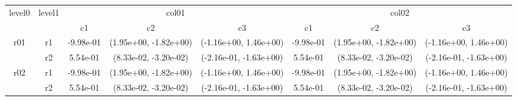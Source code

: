 \begin{tabular}{cccccccc}
\toprule
\multirow{2}{*}{level0} & \multirow{2}{*}{level1}&\multicolumn{3}{c}{col01}&\multicolumn{3}{c}{col02}\tabularnewline
\cmidrule(lr){3-5}
\cmidrule(lr){6-8}
&&c1&c2&c3&c1&c2&c3\tabularnewline
\midrule
\midrule
\multirow{2}{*}{r01}&r1&-9.98e-01& (1.95e+00, -1.82e+00)& (-1.16e+00, 1.46e+00)&-9.98e-01& (1.95e+00, -1.82e+00)& (-1.16e+00, 1.46e+00)\tabularnewline
&r2&5.54e-01& (8.33e-02, -3.20e-02)& (-2.16e-01, -1.63e+00)&5.54e-01& (8.33e-02, -3.20e-02)& (-2.16e-01, -1.63e+00)\tabularnewline
\midrule
\multirow{2}{*}{r02}&r1&-9.98e-01& (1.95e+00, -1.82e+00)& (-1.16e+00, 1.46e+00)&-9.98e-01& (1.95e+00, -1.82e+00)& (-1.16e+00, 1.46e+00)\tabularnewline
&r2&5.54e-01& (8.33e-02, -3.20e-02)& (-2.16e-01, -1.63e+00)&5.54e-01& (8.33e-02, -3.20e-02)& (-2.16e-01, -1.63e+00)\tabularnewline
\bottomrule
\end{tabular}
